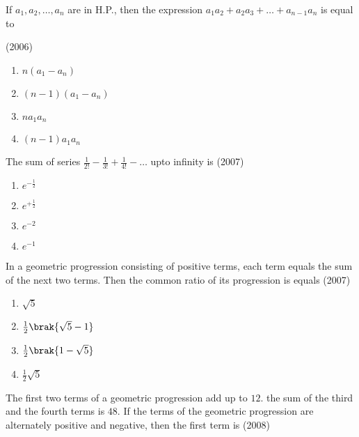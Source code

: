 \iffalse
\title{\textbf{ASSIGNMENT - 1}}
\author{\textbf{EE24BTECH11019 - Dwarak A}}
\section{mains}
\fi


    \item If $a_1,a_2,\dots,a_n$ are in H.P., then the expression $a_1a_2+a_2a_3+\dots+a_{n-1}a_n$ is equal to
    
    \hfill(2006)

    \begin{enumerate}
    \item$n(a_1-a_n)$
    \item$(n-1)(a_1-a_n)$
    \item$na_1a_n$
    \item$(n-1)a_1a_n$ 
    \end{enumerate}
    
    \item The sum of series $\frac{1}{2!}-\frac{1}{3!}+\frac{1}{4!}-\dots$ upto infinity is 
    \hfill(2007)

    \begin{enumerate}
    \item$e^{-\frac{1}{2}}$
    \item$e^{+\frac{1}{2}}$
    \item$e^{-2}$
    \item$e^{-1}$
    \end{enumerate}

    \item  In a geometric progression consisting of positive terms, each term equals the sum of the next two terms. Then the common ratio of its progression is equals   
    \hfill(2007)
    
    \begin{enumerate}
    \item$\sqrt{5}$
    \item$\frac{1}{2}\brak{\sqrt{5}-1}$
    \item$\frac{1}{2}\brak{1-\sqrt{5}}$
    \item$\frac{1}{2}\sqrt{5}$ 
    \end{enumerate}

    \item  The first two terms of a geometric progression add up to $12$. the sum of the third and the fourth terms is $48$. If the terms of the geometric progression are alternately positive and negative, then the first term is   
    \hfill(2008)
    
